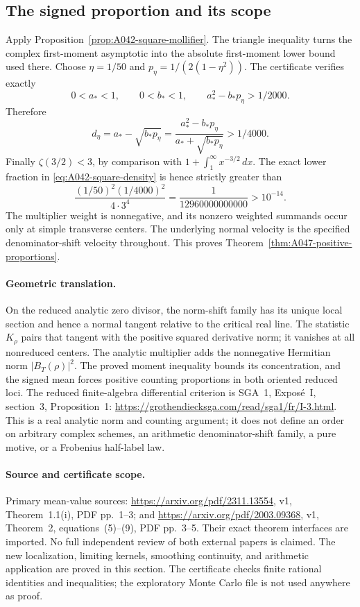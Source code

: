 \subsection*{The signed proportion and its scope}

Apply Proposition~\ref{prop:A042-square-mollifier}.
The triangle inequality turns the complex first-moment
asymptotic into the absolute first-moment lower bound used there.
Choose \(\eta=1/50\) and
\(p_\eta=1/(2(1-\eta^2))\).  The certificate verifies
exactly
\[
          0<a_*<1,\qquad 0<b_*<1,\qquad
                       a_*^2-b_*p_\eta>1/2000.
\]
Therefore
\[
 d_\eta=a_*-\sqrt{b_*p_\eta}
   =\frac{a_*^2-b_*p_\eta}{a_*+\sqrt{b_*p_\eta}}
                                               >1/4000.
\]
Finally \(\zeta(3/2)<3\), by comparison with
\(1+\int_1^\infty x^{-3/2}\,dx\).  The exact lower
fraction in \eqref{eq:A042-square-density} is hence
strictly greater than
\[
 \frac{(1/50)^2(1/4000)^2}{4\cdot3^4}
              =\frac1{12960000000000}>10^{-14}.
\]
The multiplier weight is nonnegative, and its nonzero
weighted summands occur only at simple transverse
centers.  The underlying normal velocity is the
specified denominator-shift velocity throughout.
This proves Theorem~\ref{thm:A047-positive-proportions}.

\paragraph{Geometric translation.}
On the reduced analytic zero divisor, the norm-shift
family has its unique local section and hence a
normal tangent relative to the critical real line.
The statistic \(K_\rho\) pairs that tangent with the
positive squared derivative norm; it vanishes at
all nonreduced centers.  The analytic multiplier
adds the nonnegative Hermitian norm \(|B_T(\rho)|^2\).
The proved moment inequality bounds its concentration,
and the signed mean forces positive counting
proportions in both oriented reduced loci.
The reduced finite-algebra differential criterion is
SGA~1, Expos\'e~I, section~3, Proposition~1:
\url{https://grothendiecksga.com/read/sga1/fr/I-3.html}.
This is a real analytic norm and counting argument;
it does not define an order on arbitrary complex
schemes, an arithmetic denominator-shift family,
a pure motive, or a Frobenius half-label law.

\paragraph{Source and certificate scope.}
Primary mean-value sources:
\url{https://arxiv.org/pdf/2311.13554}, v1,
Theorem~1.1(i), PDF pp.~1--3; and
\url{https://arxiv.org/pdf/2003.09368}, v1,
Theorem~2, equations~(5)--(9), PDF pp.~3--5.
Their exact theorem interfaces are imported.
No full independent review of both external papers
is claimed.  The new localization, limiting kernels,
smoothing continuity, and arithmetic application
are proved in this section.  The certificate
checks finite rational identities and inequalities;
the exploratory Monte Carlo file is not used
anywhere as proof.


